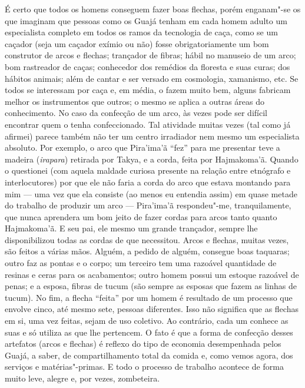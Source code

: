 É certo que todos os homens conseguem fazer boas flechas, porém
enganam"-se os que imaginam que pessoas como os Guajá tenham em cada
homem adulto um especialista completo em todos os ramos da tecnologia de
caça, como se um caçador (seja um caçador exímio ou não) fosse
obrigatoriamente um bom construtor de arcos e flechas; trançador de
fibras; hábil no manuseio de um arco; bom rastreador de caças;
conhecedor dos remédios da floresta e suas curas; dos hábitos animais;
além de cantar e ser versado em cosmologia, xamanismo, etc. Se todos se
interessam por caça e, em média, o fazem muito bem, alguns fabricam
melhor os instrumentos que outros; o mesmo se aplica a outras áreas do
conhecimento. No caso da confecção de um arco, às vezes pode ser difícil
encontrar quem o tenha confeccionado. Tal atividade muitas vezes (tal
como já afirmei) parece também não ter um centro irradiador nem mesmo um
especialista absoluto. Por exemplo, o arco que Pira'ima'ã ``fez'' para me
presentar teve a madeira (\emph{irapara}) retirada por Takya, e a corda,
feita por Hajmakoma'ã. Quando o questionei (com aquela maldade curiosa
presente na relação entre etnógrafo e interlocutores) por que ele não
faria a corda do arco que estava montando para mim --- uma vez que ela
consiste (ao menos eu entendia assim) em quase metade do trabalho de
produzir um arco --- Pira'ima'ã respondeu"-me, tranquilamente, que nunca
aprendera um bom jeito de fazer cordas para arcos tanto quanto
Hajmakoma'ã. E seu pai, ele mesmo um grande trançador, sempre lhe
disponibilizou todas as cordas de que necessitou. Arcos e flechas,
muitas vezes, são feitos a várias mãos. Alguém, a pedido de alguém,
consegue boas taquaras; outro faz as pontas e o corpo; um terceiro tem
uma razoável quantidade de resinas e ceras para os acabamentos; outro
homem possui um estoque razoável de penas; e a esposa, fibras de tucum
(são sempre as esposas que fazem as linhas de tucum). No fim, a flecha
``feita'' por um homem é resultado de um processo que envolve cinco, até
mesmo sete, pessoas diferentes. Isso não significa que as flechas em si,
uma vez feitas, sejam de uso coletivo. Ao contrário, cada um conhece as
suas e só utiliza as que lhe pertencem. O fato é que a forma de
confecção desses artefatos (arcos e flechas) é reflexo do tipo de
economia desempenhada pelos Guajá, a saber, de compartilhamento total da
comida e, como vemos agora, dos serviços e matérias"-primas. E todo o
processo de trabalho acontece de forma muito leve, alegre e, por vezes,
zombeteira.


